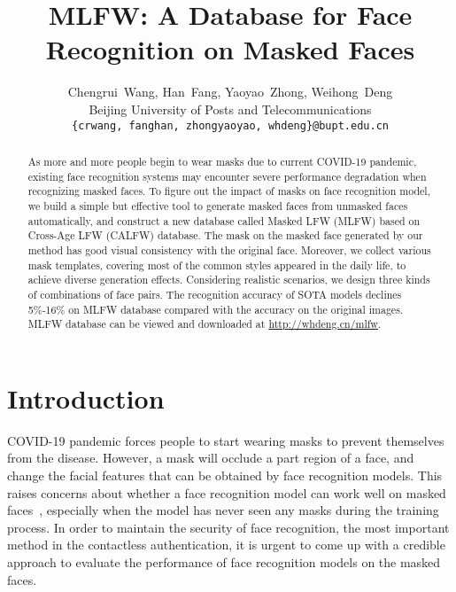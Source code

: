 \documentclass[final]{cvpr}
\begin{document}
\title{MLFW: A Database for Face Recognition on Masked Faces}
\author{Chengrui~Wang,
Han~Fang,
Yaoyao~Zhong,
Weihong~Deng\\
Beijing University of Posts and Telecommunications\\
{\tt\small \{crwang, fanghan, zhongyaoyao, whdeng\}@bupt.edu.cn}}

\maketitle


\begin{abstract}
As more and more people begin to wear masks due to current COVID-19 pandemic, existing face recognition systems may encounter severe performance degradation when recognizing masked faces. To figure out the impact of masks on face recognition model, we build a simple but effective tool to generate masked faces from unmasked faces automatically, and construct a new database called Masked LFW (MLFW) based on Cross-Age LFW (CALFW) database.  
	The mask on the masked face generated by our method has good visual consistency with the original face. Moreover, we collect various mask templates, covering most of the common styles appeared in the daily life, to achieve diverse generation effects. Considering realistic scenarios, we design three kinds of combinations of face pairs. The recognition accuracy of SOTA models declines 5\%-16\% on MLFW database compared with the accuracy on the original images. MLFW database can be viewed and downloaded at \url{http://whdeng.cn/mlfw}.
\end{abstract}

\section{Introduction}

COVID-19 pandemic forces people to start wearing masks to prevent themselves from the disease.
However, a mask will occlude a part region of a face, and change the facial features that can be obtained by face recognition models.
This raises concerns about whether a face recognition model can work well on masked faces~\cite{zhu2021masked,deng2021masked,boutros2021mfr}, especially when the model has never seen any masks during the training process.
In order to maintain the security of face recognition, the most important method in the contactless authentication, it is urgent to come up with a credible approach to evaluate the performance of face recognition models on the masked faces.
\end{document}
